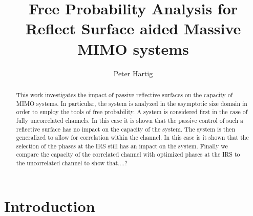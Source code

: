 \documentclass[12pt,a4paper]{report}
\title{Free Probability Analysis for Reflect Surface aided Massive MIMO systems}
\author{Peter Hartig}
\begin{document}
\maketitle
\begin{abstract}
This work investigates the impact of passive reflective surfaces on the capacity of MIMO systems. In particular, the system is analyzed in the asymptotic size domain in order to employ the tools of free probability. A system is considered first in the case of fully uncorrelated channels. In this case it is shown that the passive control of such a reflective surface has no impact on the capacity of the system. The system is then generalized to allow for correlation within the channel. In this case is it shown that the selection of the phases at the IRS still has an impact on the system. Finally we compare the capacity of the correlated channel with optimized phases at the IRS to the uncorrelated channel to show that....?
\end{abstract}
%
\tableofcontents


\chapter{Introduction}
\end{document}
